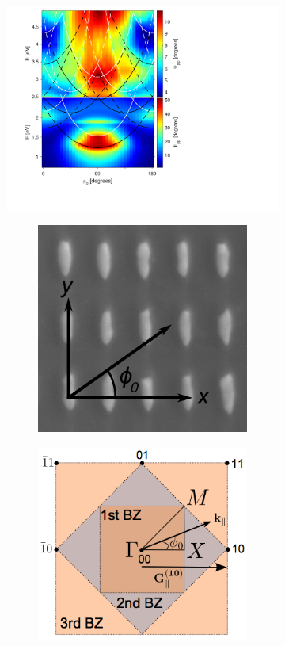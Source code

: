\begin{figure}
    \begin{subfigure}{0.5\textwidth}
        \centering
        \includegraphics[width=\linewidth, trim=1.2cm  1.8cm 6.5cm 0.3cm, clip]{figures/ch4/S5B/contour/S5B_Psipp.pdf}
        \caption{}
        \label{fig:S5B_contour_Psipp}
    \end{subfigure}
    \begin{subfigure}{0.5\textwidth}
        \centering
        \begin{subfigure}{\textwidth}
            \centering
            \includegraphics[width=0.41\linewidth]{figures/Ch3/s5b/S5B_schematic.png}
        \end{subfigure}
        
        \begin{subfigure}{\textwidth}
            \centering
            \includegraphics[width=0.5\linewidth]{figures/Ch2/ReciprocalLattice.png}
        \end{subfigure}
    \end{subfigure}
    

\end{figure}
